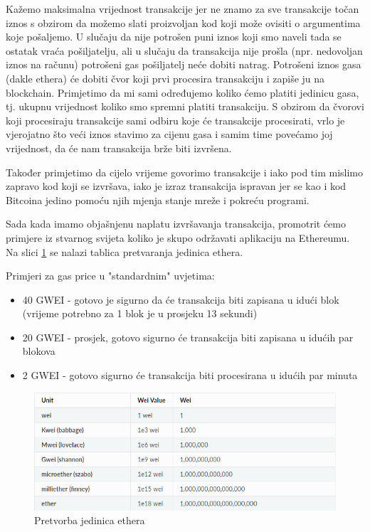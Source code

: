 \documentclass[a4paper,oneside,12pt]{memoir} %
\begin{document}
Kažemo maksimalna vrijednost transakcije jer ne znamo za sve transakcije točan iznos s obzirom da možemo slati proizvoljan kod koji može ovisiti o argumentima koje pošaljemo. U slučaju da nije potrošen puni iznos koji smo naveli tada se ostatak vraća pošiljatelju, ali u slučaju da transakcija nije prošla (npr. nedovoljan iznos na računu) potrošeni gas pošiljatelj neće dobiti natrag. Potrošeni iznos gasa (dakle ethera) će dobiti čvor koji prvi procesira transakciju i zapiše ju na blockchain. Primjetimo da mi sami određujemo koliko ćemo platiti jedinicu gasa, tj. ukupnu vrijednost koliko smo spremni platiti transakciju. S obzirom da čvorovi koji procesiraju transakcije sami odbiru koje će transakcije procesirati, vrlo je vjerojatno što veći iznos stavimo za cijenu gasa i samim time povećamo joj vrijednost, da će nam transakcija brže biti izvršena.

Također primjetimo da cijelo vrijeme govorimo transakcije i iako pod tim mislimo zapravo kod koji se izvršava, iako je izraz transakcija ispravan jer se kao i kod Bitcoina jedino pomoću njih mjenja stanje mreže i pokreću programi.

Sada kada imamo objašnjenu naplatu izvršavanja transakcija, promotrit ćemo primjere iz stvarnog svijeta koliko je skupo održavati aplikaciju na Ethereumu. Na slici \ref{fig:ethunits} se nalazi tablica pretvaranja jedinica ethera.

Primjeri za gas price u "standardnim" uvjetima: 
\begin{itemize}
    \item 40 GWEI - gotovo je sigurno da će transakcija biti zapisana u idući blok (vrijeme potrebno za 1 blok je u prosjeku 13 sekundi)
    \item 20 GWEI - prosjek, gotovo sigurno će transakcija biti zapisana u idućih par blokova
    \item 2 GWEI - gotovo sigurno će transakcija biti procesirana u idućih par minuta
\end{itemize}

\begin{figure}[H]
\centering
\includegraphics[scale=0.55]{ether_units}
\caption{Pretvorba jedinica ethera}
\label{fig:ethunits}
\end{figure}
\end{document}
